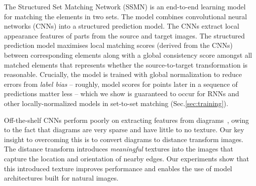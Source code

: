 \documentclass[10pt,twocolumn,letterpaper]{article}
\begin{document}
The Structured Set Matching Network (SSMN) is an end-to-end learning model for matching the elements in two sets. The model combines convolutional neural networks (CNNs) into a structured prediction model. The CNNs extract local appearance features of parts from the source and target images. The structured prediction model maximises local matching scores (derived from the CNNs) between corresponding elements along with a global consistency score amongst all matched elements that represents whether the source-to-target transformation is reasonable. Crucially, the model is trained with global normalization to reduce errors from \emph{label bias}\cite{lafferty2001conditional} -- roughly, model scores for points later in a sequence of predictions matter less -- which we show is guaranteed to occur for RNNs and other locally-normalized models in set-to-set matching (Sec.\ref{sec:training}). 


Off-the-shelf CNNs perform poorly on extracting features from diagrams~\cite{Kembhavi2016ADI, Yu2016SketchaNetAD}, owing to the fact that diagrams are very sparse and have little to no texture. Our key insight to overcoming this is to convert diagrams to distance transform images. The distance transform introduces \textit{meaningful} textures into the images that capture the location and orientation of nearby edges. Our experiments show that this introduced texture improves performance and enables the use of model architectures built for natural images.
\end{document}
